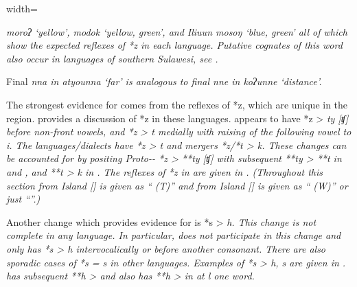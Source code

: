 \begin{table}
\begin{adjustbox}{width=\textwidth}
\begin{threeparttable}
\begin{tablenotes}
{								 \it{moroʔ} ‘yellow’,  \it{modok} ‘yellow,
								green’, and Ili{\Q}uun \it{mosoŋ} ‘blue,
								green’ all of which show the expected reflexes of *z in each language.
								Putative cognates of this word also occur in languages
								of southern Sulawesi, see .}
			\item[Δ]	{Final \it{nna} in  \it{atyounna} ‘far’ is analogous
								to final \it{nne} in  \it{koʔunne} ‘distance’.}
		\end{tablenotes}
	\end{threeparttable}
\end{adjustbox}
\end{table}

The strongest evidence for  comes from the reflexes
of *z, which are unique in the region.
\citet[289f]{Mills2010} provides a discussion of *z in these languages.
 appears to have *z > \it{ty} [ʧ] before non-front vowels,
and *z > \it{t} medially with raising of the following vowel to \it{i}.
The  languages/dialects have *z > \it{t}
and  mergers *z/*t > \it{k}.
These changes can be accounted for by positing Proto--
*z > **ty [ʧ] with subsequent **ty > **t in 
and , and **t > \it{k} in .
The reflexes of *z in are given in .
(Throughout this section  from  Island [\citealp{Chlenova2006}]
is given as “ (T)”
and  from  Island
[\citealp{DeJosselinDeJong1987}] is given
as “ (W)” or just “”.)

Another change which provides evidence for 
is *s > \it{h}.
This change is not complete in any language.
In particular,  does not participate in this change
and  only has *s > \it{h} intervocalically or before another consonant.
There are also sporadic cases of *s = \it{s} in other languages.
Examples of *s > \it{h,
s} are given in .
 has subsequent **h > {\0}
and  also has **h > {\0} in at l one word.

